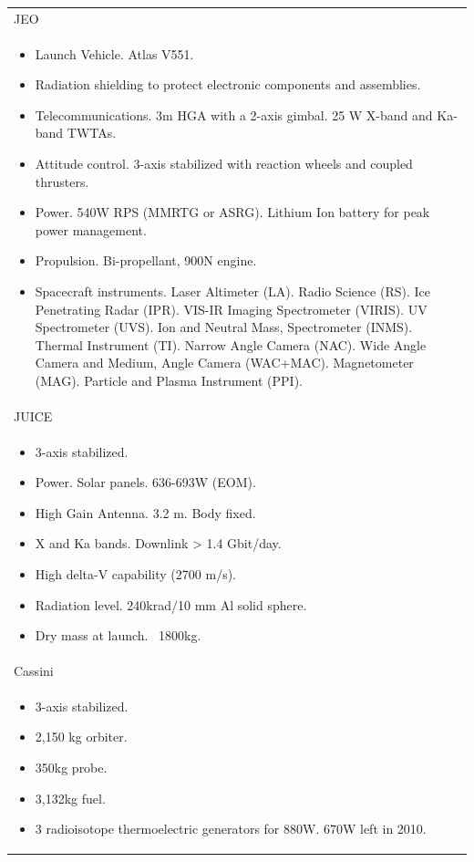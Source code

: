 \begin{supertabular}{p{\textwidth}}
  JEO \\
  \begin{itemize}
  \item Launch Vehicle. Atlas V551.
  \item Radiation shielding to protect electronic components and
    assemblies.
  \item Telecommunications. 3m HGA with a 2-axis gimbal. 25 W X-band
    and Ka-band TWTAs.
  \item Attitude control. 3-axis stabilized with reaction wheels and
    coupled thrusters.
  \item Power. 540W RPS (MMRTG or ASRG). Lithium Ion battery for peak
    power management.
  \item Propulsion. Bi-propellant, 900N engine.
  \item Spacecraft instruments. Laser Altimeter (LA). Radio Science
    (RS). Ice Penetrating Radar (IPR).  VIS-IR Imaging Spectrometer
    (VIRIS).  UV Spectrometer (UVS).  Ion and Neutral Mass,
    Spectrometer (INMS).  Thermal Instrument (TI).  Narrow Angle
    Camera (NAC).  Wide Angle Camera and Medium, Angle Camera
    (WAC+MAC).  Magnetometer (MAG).  Particle and Plasma Instrument
    (PPI).
  \end{itemize} \\

  JUICE \\
  \begin{itemize}
  \item 3-axis stabilized.
  \item Power. Solar panels. 636-693W (EOM).
  \item High Gain Antenna. 3.2 m. Body fixed.
  \item X and Ka bands. Downlink > 1.4 Gbit/day.
  \item High delta-V capability (2700 m/s).
  \item Radiation level. 240krad/10 mm Al solid sphere.
  \item Dry mass at launch. ~1800kg.
  \end{itemize} \\

  Cassini \\
  \begin{itemize}
  \item 3-axis stabilized.
  \item 2,150 kg orbiter.
  \item 350kg probe.
  \item 3,132kg fuel.
  \item 3 radioisotope thermoelectric generators for 880W. 670W left
    in 2010.
  \end{itemize} \\
\end{supertabular}

